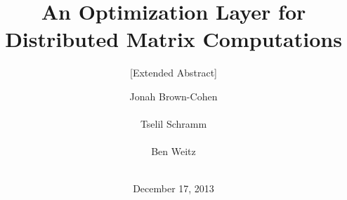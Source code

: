 \documentclass{acm_proc_article-sp}
\begin{document}
\title{An Optimization Layer for Distributed Matrix Computations}
\subtitle{[Extended Abstract]}
%
%
%
%
%

%
\author{
%
%
\alignauthor
Jonah Brown-Cohen\\
       \\
\alignauthor
Tselil Schramm\\
       \\
\alignauthor 
Ben Weitz\\
       \\
}
\date{December 17, 2013}
\end{document}
